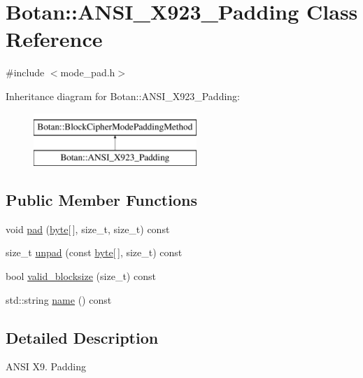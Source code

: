 \hypertarget{classBotan_1_1ANSI__X923__Padding}{\section{Botan\-:\-:A\-N\-S\-I\-\_\-\-X923\-\_\-\-Padding Class Reference}
\label{classBotan_1_1ANSI__X923__Padding}
}


{\ttfamily \#include $<$mode\-\_\-pad.\-h$>$}

Inheritance diagram for Botan\-:\-:A\-N\-S\-I\-\_\-\-X923\-\_\-\-Padding\-:\begin{figure}[H]
\begin{center}
\leavevmode
\includegraphics[height=2.000000cm]{classBotan_1_1ANSI__X923__Padding}
\end{center}
\end{figure}
\subsection*{Public Member Functions}
\begin{DoxyCompactItemize}
\item 
void \hyperlink{classBotan_1_1ANSI__X923__Padding_aa02cfd559ade90b9b3f3a2ca6b5243d7}{pad} (\hyperlink{namespaceBotan_a7d793989d801281df48c6b19616b8b84}{byte}\mbox{[}$\,$\mbox{]}, size\-\_\-t, size\-\_\-t) const 
\item 
size\-\_\-t \hyperlink{classBotan_1_1ANSI__X923__Padding_ad0aade00e15c5ee95dfe1e93174811de}{unpad} (const \hyperlink{namespaceBotan_a7d793989d801281df48c6b19616b8b84}{byte}\mbox{[}$\,$\mbox{]}, size\-\_\-t) const 
\item 
bool \hyperlink{classBotan_1_1ANSI__X923__Padding_a61538bf8b2d48e2f3deac2fd1b2b8f95}{valid\-\_\-blocksize} (size\-\_\-t) const 
\item 
std\-::string \hyperlink{classBotan_1_1ANSI__X923__Padding_a2dc2002fe6ff17a1b8814e836fc4d349}{name} () const 
\end{DoxyCompactItemize}


\subsection{Detailed Description}
A\-N\-S\-I X9. Padding 


